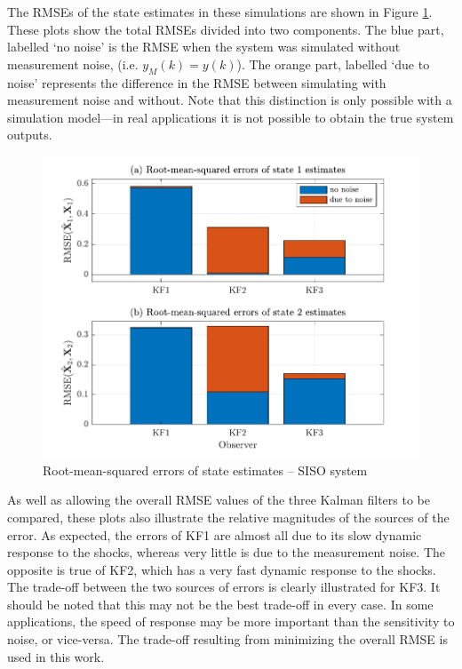 The RMSEs of the state estimates in these simulations are shown in Figure \ref{fig:rod-obs-sim1-KF123-xest-RMSE-bar}. These plots show the total RMSEs divided into two components. The blue part, labelled `no noise' is the RMSE when the system was simulated without measurement noise, (i.e. $y_M(k)=y(k)$). The orange part, labelled `due to noise' represents the difference in the RMSE between simulating with measurement noise and without. Note that this distinction is only possible with a simulation model---in real applications it is not possible to obtain the true system outputs.
\begin{figure}[htp]
	\centering
	\includegraphics[width=12cm]{images/rod_obs_sim1_all_seed_x_err_bar_KF123.pdf}
	\caption{Root-mean-squared errors of state estimates – SISO system}
	\label{fig:rod-obs-sim1-KF123-xest-RMSE-bar}
\end{figure}

As well as allowing the overall RMSE values of the three Kalman filters to be compared, these plots also illustrate the relative magnitudes of the sources of the error. As expected, the errors of KF1 are almost all due to its slow dynamic response to the shocks, whereas very little is due to the measurement noise. The opposite is true of KF2, which has a very fast dynamic response to the shocks. The trade-off between the two sources of errors is clearly illustrated for KF3. It should be noted that this may not be the best trade-off in every case. In some applications, the speed of response may be more important than the sensitivity to noise, or vice-versa. The trade-off resulting from minimizing the overall RMSE is used in this work.

